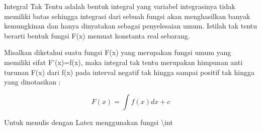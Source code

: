 \documentclass[a4paper,10pt]{article}
\begin{document}
\begin{eulernotebook}
\begin{eulercomment}
\begin{eulercomment}
\begin{eulercomment}
\begin{eulercomment}
\begin{eulercomment}
\begin{eulercomment}
\begin{eulercomment}
\begin{eulercomment}
\begin{eulercomment}
\begin{eulercomment}
\begin{eulercomment}
\begin{eulercomment}
\begin{eulercomment}
\begin{eulercomment}
\begin{eulercomment}
\begin{eulercomment}
\begin{eulercomment}
\begin{eulercomment}
\begin{eulercomment}
\begin{eulercomment}
\begin{eulercomment}
\begin{eulercomment}
\begin{eulercomment}
\end{eulercomment}
\begin{eulercomment}
Integral Tak Tentu adalah bentuk integral yang variabel integrasinya
tidak memiliki batas sehingga integrasi dari sebuah fungsi akan
menghasilkan banyak kemungkinan dan hanya dinyatakan sebagai
penyelesaian umum. Istilah tak tentu berarti bentuk fungsi F(x) memuat
konstanta real sebarang.

Misalkan diketahui suatu fungsi F(x) yang merupakan fungsi umum yang
memiliki sifat F'(x)=f(x), maka integral tak tentu merupakan himpunan
anti turunan F(x) dari f(x) pada interval negatif tak hingga sampai
positif tak hingga yang dinotasikan :\\
\end{eulercomment}
\begin{eulerformula}
\[
F(x) = \int f(x) dx+c
\]
\end{eulerformula}
\begin{eulercomment}
\end{eulercomment}
\begin{eulercomment}
Untuk menulis dengan Latex menggunakan fungsi \textbackslash{}int



\end{eulercomment}
\end{eulercomment}
\end{eulercomment}
\end{eulercomment}
\end{eulercomment}
\end{eulercomment}
\end{eulercomment}
\end{eulercomment}
\end{eulercomment}
\end{eulercomment}
\end{eulercomment}
\end{eulercomment}
\end{eulercomment}
\end{eulercomment}
\end{eulercomment}
\end{eulercomment}
\end{eulercomment}
\end{eulercomment}
\end{eulercomment}
\end{eulercomment}
\end{eulercomment}
\end{eulercomment}
\end{eulercomment}
\end{eulernotebook}
\end{document}
